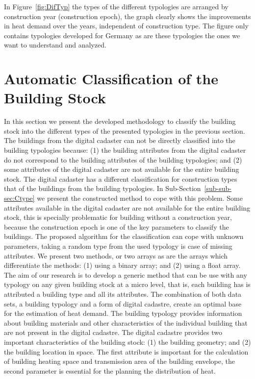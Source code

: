 \documentclass[authoryear,preprint,review,12pt]{elsarticle}
\begin{document}
\begin{linenumbers}
In Figure~\ref{fig:DifTyp} the types of the different typologies are arranged by
construction year (construction epoch), the graph clearly shows the
improvements in heat demand over the years, independent of construction type.
The figure only contains typologies developed for Germany as are these
typologies the ones we want to understand and analyzed.\\



\section{Automatic Classification of the Building Stock}\label{sec:class}

In this section we present the developed methodology to classify the building
stock into the different types of the presented typologies in the previous
section. The buildings from the digital cadaster can not be directly
classified into the building typologies because: (1) the building attributes
from the digital cadaster do not correspond to the building attributes of the
building typologies; and (2) some attributes of the digital cadaster are not
available for the entire building stock.  The digital cadaster has a different
classification for construction types that of the buildings from the building
typologies. In Sub-Section~\ref{sub-sub-sec:Ctype} we present the constructed
method to cope with this problem. Some attributes available in the
digital cadaster are not available for the entire building stock, this is
specially problematic for building without a construction year, because the
construction epoch is one of the key parameters to classify the buildings.  The
proposed algorithm for the classification can cope with unknown parameters,
taking a random type from the used typology is case of missing attributes.  We
present two methods, or two arrays as are the arrays which differentiate the
methods: (1) using a binary array; and (2) using a float array.\\

The aim of our research is to develop a generic method that can be use with any
typology on any given building stock at a micro level, that is, each building
has is attributed a building type and all its attributes.  The combination of
both data sets, a building typology and a form of digital cadastre, create an
optimal base for the estimation of heat demand. The building typology provides
information about building materials and other characteristics of the
individual building that are not present in the digital cadastre. The digital
cadastre provides two important characteristics of the building stock: (1) the
building geometry; and (2) the building location in space.  The first attribute
is important for the calculation of building heating space and transmission
area of the building envelope, the second parameter is essential for the
planning the distribution of heat.\\


\end{linenumbers}
\end{document}
